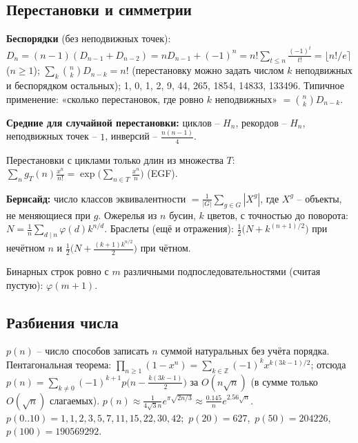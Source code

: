 \subsection{Перестановки и симметрии}
\textbf{Беспорядки} (без неподвижных точек): $D_n=(n{-}1)(D_{n-1}+D_{n-2})=nD_{n-1}+(-1)^n=n!\sum_{t\le n}\frac{(-1)^t}{t!}=\lfloor n!/e\rceil$ ($n\ge1$); $\sum_k\binom nkD_{n-k}=n!$ (перестановку можно задать числом $k$ неподвижных и беспорядком остальных); {\footnotesize 1, 0, 1, 2, 9, 44, 265, 1854, 14833, 133496}. Типичное применение: «сколько перестановок, где ровно $k$ неподвижных» $=\binom nkD_{n-k}$.
\par \textbf{Средние для случайной перестановки:} циклов -- $H_n$, рекордов -- $H_n$, неподвижных точек -- $1$, инверсий -- $\frac{n(n-1)}4$.
\par Перестановки с циклами только длин из множества $T$: $\sum_n g_T(n)\frac{x^n}{n!}=\exp\big(\sum_{n\in T}\frac{x^n}n\big)$ (EGF).
\par \textbf{Бернсайд:} число классов эквивалентности $=\frac1{|G|}\sum_{g\in G}|X^g|$, где $X^g$ -- объекты, не меняющиеся при $g$. Ожерелья из $n$ бусин, $k$ цветов, с точностью до поворота: $N=\frac1n\sum_{d\mid n}\varphi(d)k^{n/d}$. Браслеты (ещё и отражения): $\frac12\big(N+k^{(n+1)/2}\big)$ при нечётном $n$ и $\frac12\big(N+\frac{(k+1)k^{n/2}}2\big)$ при чётном.
\par Бинарных строк ровно с $m$ различными подпоследовательностями (считая пустую): $\varphi(m{+}1)$.
\subsection{Разбиения числа}
$p(n)$ -- число способов записать $n$ суммой натуральных без учёта порядка. Пентагональная теорема: $\prod_{n\ge1}(1-x^n)=\sum_{k\in\mathbb Z}(-1)^kx^{k(3k-1)/2}$; отсюда $p(n)=\sum_{k\ne0}(-1)^{k+1}p\big(n-\tfrac{k(3k-1)}2\big)$ за $O(n\sqrt n)$ (в сумме только $O(\sqrt n)$ слагаемых). $p(n)\approx\frac1{4\sqrt3n}e^{\pi\sqrt{2n/3}}\approx\frac{0.145}ne^{2.56\sqrt n}$.\\
{\footnotesize $p(0..10)=1,1,2,3,5,7,11,15,22,30,42$;\ $p(20)=627$,\ $p(50)=204226$,\ $p(100)=190569292$}.
